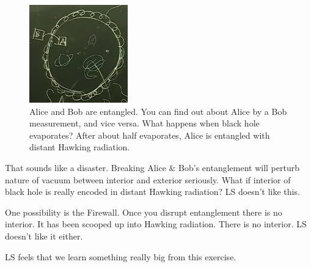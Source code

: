 \documentclass[]{article}
\begin{document}
\begin{figure}[H]
	\begin{center}
		\caption[Alice and Bob are entangled.]{Alice and Bob are entangled. You can find out about Alice by a Bob measurement, and vice versa. What happens when black hole evaporates? After about half evaporates, Alice is entangled with distant Hawking radiation.}\label{fig:ibh-horizon-alice-bob}
		\includegraphics{ibh-horizon-alice-bob}
	\end{center}
\end{figure}
That sounds like a disaster. Breaking Alice \& Bob's entanglement will perturb nature of vacuum between interior and exterior seriously. What if interior of black hole is really encoded in distant Hawking radiation? LS doesn't like this.

One possibility is the Firewall. Once you disrupt entanglement there is no interior. It has been scooped up into Hawking radiation. There is no interior. LS doesn't like it either.

LS feels that we learn something really big from this exercise.
\end{document}
